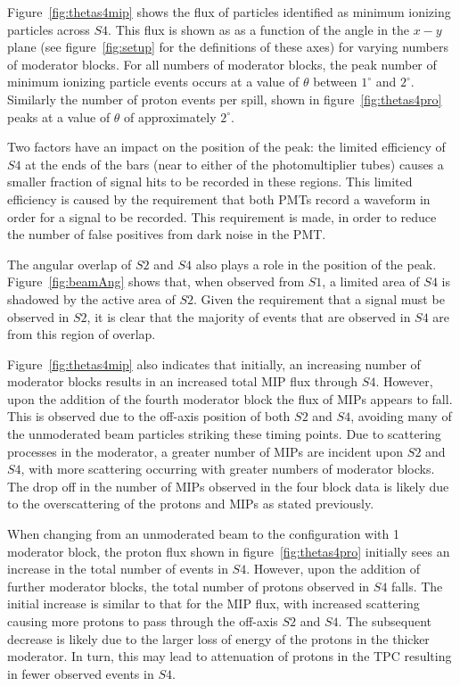 	Figure~\ref{fig:thetas4mip} shows the flux of particles identified as minimum ionizing particles across $S4$.
	This flux is shown as as a function of the angle in the $x-y$ plane (see figure~\ref{fig:setup} for the definitions of these axes) for varying numbers of moderator blocks.
	For all numbers of moderator blocks, the peak number of minimum ionizing particle events occurs at a value of $\theta$ between $1^{\circ}$ and $2^{\circ}$.
	Similarly the number of proton events per spill, shown in figure~\ref{fig:thetas4pro} peaks at a value of $\theta$ of approximately $2^{\circ}$.
	
	Two factors have an impact on the position of the peak:
	the limited efficiency of $S4$ at the ends of the bars (near to either of the photomultiplier tubes) causes a smaller fraction of signal hits to be recorded in these regions. 
	This limited efficiency is caused by the requirement that both PMTs record a waveform in order for a signal to be recorded.
	This requirement is made, in order to reduce the number of false positives from dark noise in the PMT.
	
	The angular overlap of $S2$ and $S4$ also plays a role in the position of the peak. 
	Figure~\ref{fig:beamAng} shows that, when observed from $S1$, a limited area of $S4$ is shadowed by the active area of $S2$.
	Given the requirement that a signal must be observed in $S2$, it is clear that the majority of events that are observed in $S4$ are from this region of overlap.
   
   	Figure~\ref{fig:thetas4mip} also indicates that initially, an increasing number of moderator blocks results in an increased total MIP flux through $S4$. 
   	However, upon the addition of the fourth moderator block the flux of MIPs appears to fall.
   	This is observed due to the off-axis position of both $S2$ and $S4$, avoiding many of the unmoderated beam particles striking these timing points.
   	Due to scattering processes in the moderator, a greater number of MIPs are incident upon $S2$ and $S4$, with more scattering occurring with greater numbers of moderator blocks.
   	The drop off in the number of MIPs observed in the four block data is likely due to the overscattering of the protons and MIPs as stated previously.
   	
   	When changing from an unmoderated beam to the configuration with 1 moderator block, the proton flux shown in figure~\ref{fig:thetas4pro} initially sees an increase in the total number of events in $S4$.
   	However, upon the addition of further moderator blocks, the total number of protons observed in $S4$ falls.
   	The initial increase is similar to that for the MIP flux, with increased scattering causing more protons to pass through the off-axis $S2$ and $S4$.
   	The subsequent decrease is likely due to the larger loss of energy of the protons in the thicker moderator.
   	In turn, this may lead to attenuation of protons in the TPC resulting in fewer observed events in $S4$.
   

